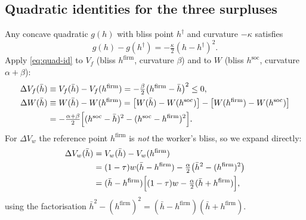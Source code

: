 \documentclass[a4paper,11pt]{article}
\begin{document}
\subsection{Quadratic identities for the three surpluses}
Any concave quadratic $g(h)$ with bliss point $h^{\dagger}$ and curvature $-\kappa$ satisfies
\begin{equation}
g(h)-g(h^{\dagger})=-\tfrac{\kappa}{2}(h-h^{\dagger})^{2}. \label{eq:quad-id}
\end{equation}
Apply \eqref{eq:quad-id} to $V_f$ (bliss $h^{\mathrm{firm}}$, curvature $\beta$) and to $W$ (bliss $h^{\mathrm{soc}}$, curvature $\alpha+\beta$):
\begin{align}
\Delta V_f(\bar h) &\equiv V_f(\bar h)-V_f(h^{\mathrm{firm}}) = -\tfrac{\beta}{2}\bigl(h^{\mathrm{firm}}-\bar h\bigr)^{2}\le 0, \label{eq:dVf}\\
\Delta W(\bar h) &\equiv W(\bar h)-W(h^{\mathrm{firm}})
   = \bigl[W(\bar h)-W(h^{\mathrm{soc}})\bigr] - \bigl[W(h^{\mathrm{firm}})-W(h^{\mathrm{soc}})\bigr] \nonumber\\
   &= -\tfrac{\alpha+\beta}{2}\Bigl[(h^{\mathrm{soc}}-\bar h)^{2}-(h^{\mathrm{soc}}-h^{\mathrm{firm}})^{2}\Bigr]. \label{eq:dW}
\end{align}
For $\Delta V_w$ the reference point $h^{\mathrm{firm}}$ is \emph{not} the worker's bliss, so we expand directly:
\begin{align}
\Delta V_w(\bar h)
&= V_w(\bar h)-V_w(h^{\mathrm{firm}}) \nonumber\\
&= (1-\tau)w(\bar h-h^{\mathrm{firm}})-\tfrac{\alpha}{2}\bigl(\bar h^{2}-(h^{\mathrm{firm}})^{2}\bigr) \nonumber\\
&= (\bar h-h^{\mathrm{firm}})\Bigl[(1-\tau)w-\tfrac{\alpha}{2}(\bar h+h^{\mathrm{firm}})\Bigr], \label{eq:dVw}
\end{align}
using the factorisation $\bar h^{2}-(h^{\mathrm{firm}})^{2}=(\bar h-h^{\mathrm{firm}})(\bar h+h^{\mathrm{firm}})$.
\end{document}
